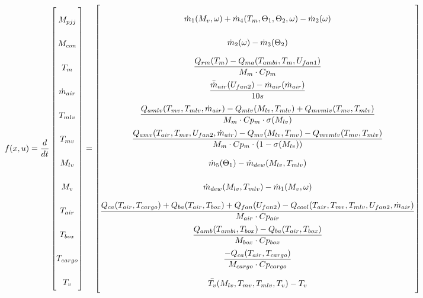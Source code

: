 \begin{equation} \label{eq:f_noSub} \renewcommand{\arraystretch}{2.4}
	f(x,u) =  \dfrac{d}{dt} \begin{bmatrix}
		M_{pjj}			\\				%
		M_{con} 		\\				%
		T_m 			\\				%
		\dot{m}_{air}	\\				%
		T_{mlv}			\\				%
		T_{mv}			\\				%
		M_{lv}			\\				%
		M_v				\\				%
		T_{air}			\\				%
		T_{box}			\\				%
		T_{cargo}		\\				%
		T_v								%
	\end{bmatrix}
	=
	\begin{bmatrix}
		\dot{m}_1(M_{v}, \omega) + \dot{m}_4(T_m,\Theta_1,\Theta_2,\omega) - \dot{m}_2(\omega) \\										%
		\dot{m}_{2}(\omega) - \dot{m}_{3}(\Theta_2)	\\												%
		\dfrac{Q_{rm}(T_m) - Q_{ma}(T_{ambi}, T_m, U_{fan1})}{M_m \cdot Cp_m} \\									%
		\dfrac{\bar{\dot{m}}_{air}(U_{fan2})  - \dot{m}_{air}(\dot{m}_{air})} {10s}		\\					%
		\dfrac{Q_{amlv}(T_{mv},T_{mlv},\dot{m}_{air})-Q_{mlv}(M_{lv},T_{mlv}) + Q_{mvmlv}(T_{mv},T_{mlv})}{M_m \cdot Cp_m \cdot \sigma(M_{lv})}        \\	%
		\dfrac{Q_{amv}(T_{air},T_{mv},U_{fan2},\dot{m}_{air}) - Q_{mv}(M_{lv},T_{mv}) - Q_{mvmlv}(T_{mv},T_{mlv})}{M_m \cdot Cp_m \cdot (1- \sigma(M_{lv}))}	\\	%
		\dot{m}_{5}(\Theta_1) - \dot{m}_{dew}(M_{lv},T_{mlv})		\\											%
		\dot{m}_{dew}(M_{lv},T_{mlv}) - \dot{m}_1(M_{v}, \omega)	\\												%
		\dfrac{Q_{ca}(T_{air},T_{cargo}) + Q_{ba}(T_{air},T_{box}) + Q_{fan}(U_{fan2}) - Q_{cool}(T_{air},T_{mv},T_{mlv},U_{fan2},\dot{m}_{air})}{M_{air} \cdot Cp_{air}} \\					%
		\dfrac{Q_{amb}(T_{ambi},T_{box}) -  Q_{ba}(T_{air},T_{box})}{M_{box} \cdot Cp_{box}} \\							%
		\dfrac{-Q_{ca}(T_{air},T_{cargo})}{M_{cargo} \cdot Cp_{cargo}}									\\	%
		\bar{T_v}(M_{lv},T_{mv},T_{mlv},T_v) - T_v
	\end{bmatrix}
\end{equation}

